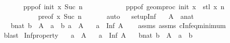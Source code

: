 \begin{isabellebody}
\ \ \ \ \ \isamarkupfalse%
\ ppp{}{\isacharbrackleft}{\kern0pt}of\ init\ x\ {\isachardoublequoteopen}Suc\ n{\isachardoublequoteclose}{\isacharbrackright}{\kern0pt}\ \isanewline
\ \ \ \ \ \ \ \ \ \ \ ppp{}{\isacharbrackleft}{\kern0pt}of\ {\isachardoublequoteopen}geom{\isacharunderscore}{\kern0pt}proc\ init\ x\ {}{\isachardoublequoteclose}\ {\isachardoublequoteopen}stl\ x{\isachardoublequoteclose}\ n{\isacharbrackright}{\kern0pt}\isanewline
\ \ \ \ \ \ \ \ \ \ \ pre{}{\isacharbrackleft}{\kern0pt}of\ x\ {\isachardoublequoteopen}Suc\ n{\isachardoublequoteclose}{\isacharbrackright}{\kern0pt}\isanewline
\ \ \ \ \ \isamarkupfalse%
\ auto\isanewline
\ \isamarkupfalse%
%
\endisatagproof
{\isafoldproof}%
%
\isadelimproof
%
\endisadelimproof
%
\isadelimdocument
%
\endisadelimdocument
%
\isatagdocument
%
\isamarkuptrue%
%
\endisatagdocument
{\isafolddocument}%
%
\isadelimdocument
%
\endisadelimdocument
{}\isamarkupfalse%
\ set{\isacharunderscore}{\kern0pt}up{\isacharunderscore}{\kern0pt}Inf{\isacharcolon}{\kern0pt}\isanewline
\ \ \ A\ \ a{\isacharcolon}{\kern0pt}{\isacharcolon}{\kern0pt}nat\isanewline
\ \ \ {\isachardoublequoteopen}{\isasymAnd}b{\isacharcolon}{\kern0pt}{\isacharcolon}{\kern0pt}nat{\isachardot}{\kern0pt}\ b\ {\isasymin}\ A\ {\isasymLongrightarrow}\ a\ {\isasymle}\ b{\isachardoublequoteclose}\ {\isachardoublequoteopen}a\ {\isasymin}\ A{\isachardoublequoteclose}\isanewline
\ \ \ {\isachardoublequoteopen}a\ {\isacharequal}{\kern0pt}\ Inf\ A{\isachardoublequoteclose}\isanewline
%
\isadelimproof
\ \ %
\endisadelimproof
%
\isatagproof
{}\isamarkupfalse%
\ assms{\isacharparenleft}{\kern0pt}{}{\isacharparenright}{\kern0pt}\ assms{\isacharparenleft}{\kern0pt}{}{\isacharparenright}{\kern0pt}\ cInf{\isacharunderscore}{\kern0pt}eq{\isacharunderscore}{\kern0pt}minimum\ \isanewline
\ \ \isamarkupfalse%
\ blast%
\endisatagproof
{\isafoldproof}%
%
\isadelimproof
\isanewline
%
\endisadelimproof
\isanewline
{}\isamarkupfalse%
\ Inf{\isacharunderscore}{\kern0pt}property{\isacharcolon}{\kern0pt}\isanewline
\ \ \ a\ \ A\isanewline
\ \ \ {\isachardoublequoteopen}a\ {\isacharequal}{\kern0pt}\ Inf\ A{\isachardoublequoteclose}\isanewline
\ \ \ {\isachardoublequoteopen}{\isasymAnd}b{\isacharcolon}{\kern0pt}{\isacharcolon}{\kern0pt}nat{\isachardot}{\kern0pt}\ b\ {\isasymin}\ A\ {\isasymLongrightarrow}\ a\ {\isasymle}\ b{\isachardoublequoteclose}\isanewline

\end{isabellebody}
